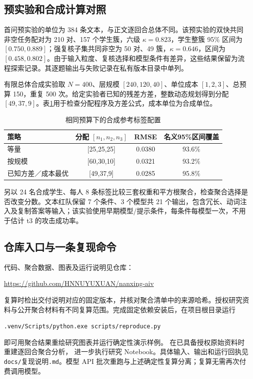 \subsection{预实验和合成计算对照}\label{app:simulation}
首问预实验的单位为 384 条文本，与正文逐回合总体不同。该预实验的双快共同非空任务配对为 210 对、157 个学生簇，六级 $\kappa=0.823$，学生整簇 95\% 区间为 $[0.750,0.889]$；强复核子集共同非空为 50 对、49 簇，$\kappa=0.646$，区间为 $[0.458,0.802]$。由于输入粒度、复核选择和模型条件有差异，这些结果保留为流程探索记录。其逐题输出与失败记录在私有版本目录中单列。

有限总体合成实验取 $N=400$、层规模 $[240,120,40]$、单位成本 $[1,2,3]$、总预算 150，重复 500 次。给定实验者已知的残差方差，整数动态规划得到分配 $[49,37,9]$。表\ref{app:cost}用于检查分配程序及方差公式，成本单位为合成单位。
\begin{table}[htbp]\centering\small
\caption{相同预算下的合成参考标签配置}\label{app:cost}
\begin{tabular}{@{}lccc@{}}\toprule
策略 & 分配 $[n_1,n_2,n_3]$ & RMSE & 名义95\%区间覆盖\\\midrule
等量 & [25,25,25] & 0.0380 & 93.6\%\\
按规模 & [60,30,10] & 0.0321 & 93.2\%\\
已知方差／成本最优 & [49,37,9] & 0.0285 & 95.8\%\\\bottomrule
\end{tabular}
\end{table}

另以 24 名合成学生、每人 8 条标签比较三套权重和平方根聚合，检查聚合选择是否改变分数。文本红队保留 7 个条件、3 个模型共 21 个输出，包含冗长、动词注入及复制答案等输入；该实验使用早期模型/提示条件，每条件每模型一次，不用于估计 t3 的攻击成功率。

\subsection{仓库入口与一条复现命令}
代码、聚合数据、图表及运行说明见仓库：
\begin{center}\small\url{https://github.com/HNNUYUXUAN/nanxing-aiv}\end{center}
复算时检出交付说明对应的固定版本，并核对聚合清单中的来源哈希。授权研究资料与公开聚合材料有不同复算范围。完成固定依赖安装后，在项目根目录运行
\begin{center}\small\texttt{.venv/Scripts/python.exe\ scripts/reproduce.py}\end{center}
即可用聚合结果重绘研究图表并运行确定性演示样例。 在已具备授权原始资料时重建逐回合聚合分析， 进一步执行研究 Notebook。具体输入、输出和运行回执见 \texttt{docs/}复现说明\texttt{.md}。模型 API 批次重跑与上述确定性复算分离；复算无需再次付费调用模型。

